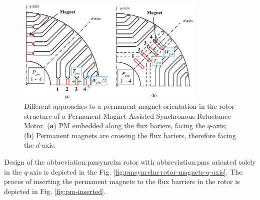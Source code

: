 \documentclass[a4paper, twoside, 11pt]{article}
\begin{document}
    \begin{figure}[htbp!]
            \centering
            \includegraphics[width=0.8\textwidth]{src/png/pmsynrelm-rotor-magnets-position.png}
            \caption{Different approaches to a permanent magnet orientation in the rotor structure of a Permanent Magnet Assisted Synchronous Reluctance Motor. (\textbf{a}) PM embedded along the flux bariers, facing the $q$-axis; (\textbf{b}) Permanent magnets are crossing the flux bariers, therefore facing the $d$-axis. \cite{ngo-performance-analysis-of-synchronous-reluctance-motor-with-limited-amount-of-permanent-magnet}}
            \label{fig:pmsynrelm-rotor-magnets-position}
    \end{figure}

    Design of the \gls{abbreviation:pmsynrelm} rotor with \gls{abbreviation:pm}s oriented solely in the $q$-axis is depicted in the Fig. \ref{fig:pmsynrelm-rotor-magnets-q-axis}. The proces of inserting the permanent magnets to the flux barriers in the rotor is depicted in Fig. \ref{fig:pm-inserted}.
    
\end{document}
